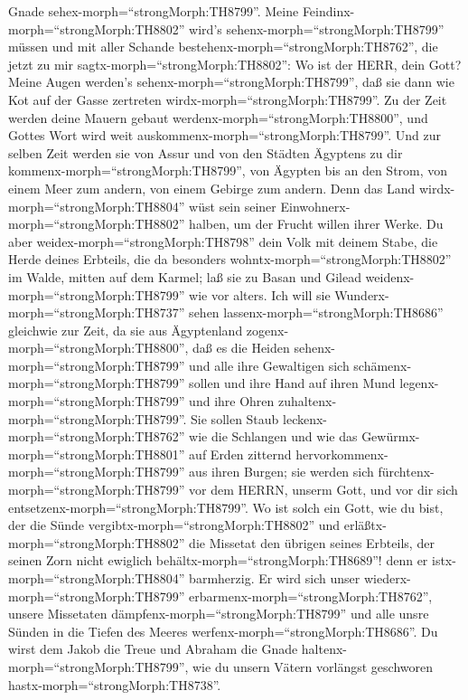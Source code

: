 Gnade sehex-morph=``strongMorph:TH8799''.  Meine
Feindinx-morph=``strongMorph:TH8802'' wird's
sehenx-morph=``strongMorph:TH8799'' müssen und mit aller Schande
bestehenx-morph=``strongMorph:TH8762'', die jetzt zu mir
sagtx-morph=``strongMorph:TH8802'': Wo ist der HERR, dein Gott? Meine
Augen werden's sehenx-morph=``strongMorph:TH8799'', daß sie dann wie Kot
auf der Gasse zertreten wirdx-morph=``strongMorph:TH8799''.
 Zu der Zeit werden deine Mauern gebaut
werdenx-morph=``strongMorph:TH8800'', und Gottes Wort wird weit
auskommenx-morph=``strongMorph:TH8799''.  Und zur selben
Zeit werden sie von Assur und von den Städten Ägyptens zu dir
kommenx-morph=``strongMorph:TH8799'', von Ägypten bis an den Strom, von
einem Meer zum andern, von einem Gebirge zum andern.  Denn
das Land wirdx-morph=``strongMorph:TH8804'' wüst sein seiner
Einwohnerx-morph=``strongMorph:TH8802'' halben, um der Frucht willen
ihrer Werke.  Du aber weidex-morph=``strongMorph:TH8798''
dein Volk mit deinem Stabe, die Herde deines Erbteils, die da besonders
wohntx-morph=``strongMorph:TH8802'' im Walde, mitten auf dem Karmel; laß
sie zu Basan und Gilead weidenx-morph=``strongMorph:TH8799'' wie vor
alters.  Ich will sie Wunderx-morph=``strongMorph:TH8737''
sehen lassenx-morph=``strongMorph:TH8686'' gleichwie zur Zeit, da sie
aus Ägyptenland zogenx-morph=``strongMorph:TH8800'',  daß
es die Heiden sehenx-morph=``strongMorph:TH8799'' und alle ihre
Gewaltigen sich schämenx-morph=``strongMorph:TH8799'' sollen und ihre
Hand auf ihren Mund legenx-morph=``strongMorph:TH8799'' und ihre Ohren
zuhaltenx-morph=``strongMorph:TH8799''.  Sie sollen Staub
leckenx-morph=``strongMorph:TH8762'' wie die Schlangen und wie das
Gewürmx-morph=``strongMorph:TH8801'' auf Erden zitternd
hervorkommenx-morph=``strongMorph:TH8799'' aus ihren Burgen; sie werden
sich fürchtenx-morph=``strongMorph:TH8799'' vor dem HERRN, unserm Gott,
und vor dir sich entsetzenx-morph=``strongMorph:TH8799''. 
Wo ist solch ein Gott, wie du bist, der die Sünde
vergibtx-morph=``strongMorph:TH8802'' und
erläßtx-morph=``strongMorph:TH8802'' die Missetat den übrigen seines
Erbteils, der seinen Zorn nicht ewiglich
behältx-morph=``strongMorph:TH8689''! denn er
istx-morph=``strongMorph:TH8804'' barmherzig.  Er wird sich
unser wiederx-morph=``strongMorph:TH8799''
erbarmenx-morph=``strongMorph:TH8762'', unsere Missetaten
dämpfenx-morph=``strongMorph:TH8799'' und alle unsre Sünden in die
Tiefen des Meeres werfenx-morph=``strongMorph:TH8686''.  Du
wirst dem Jakob die Treue und Abraham die Gnade
haltenx-morph=``strongMorph:TH8799'', wie du unsern Vätern vorlängst
geschworen hastx-morph=``strongMorph:TH8738''.
